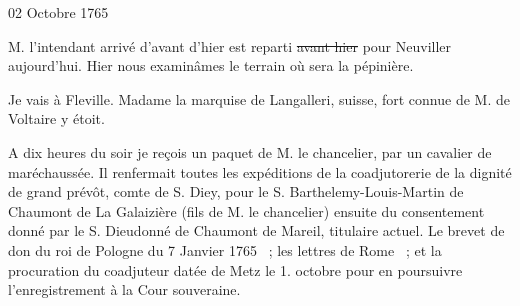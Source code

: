                      
                     \begin{diary}{02 Octobre 1765}{}
                        
                        
                           M. l'intendant arrivé d'avant d'hier est
                           reparti
                           \sout{avant hier} pour Neuviller aujourd'hui.
                           Hier nous examinâmes le terrain où
                           sera
                           la pépinière. \bigskip
        
        
                         Je vais à Fleville. Madame la marquise de
                              Langalleri, suisse, fort connue de M. de
                              Voltaire y étoit. \bigskip
        
        
                         A dix heures du soir je reçois un
                           paquet
                           de M. le chancelier, par un
                           cavalier
                           de maréchaussée. Il renfermait toutes les
                           expéditions de la coadjutorerie de la dignité
                           de grand prévôt,
                           comte de S. Diey, pour le S.
                              Barthelemy-Louis-Martin de Chaumont de
                              La Galaizière (fils de M. le chancelier) ensuite
                           du consentement donné par le S. Dieudonné
                              de Chaumont de Mareil, titulaire actuel.
                           Le brevet de don du roi de
                              Pologne
                           du
                              7 Janvier 1765  ; les lettres de Rome  ; et la
                           procuration du coadjuteur datée de Metz
                           le 1.
                              octobre pour en poursuivre l'enregistrement
                           à la Cour souveraine. \bigskip
        
        
                     \end{diary}

